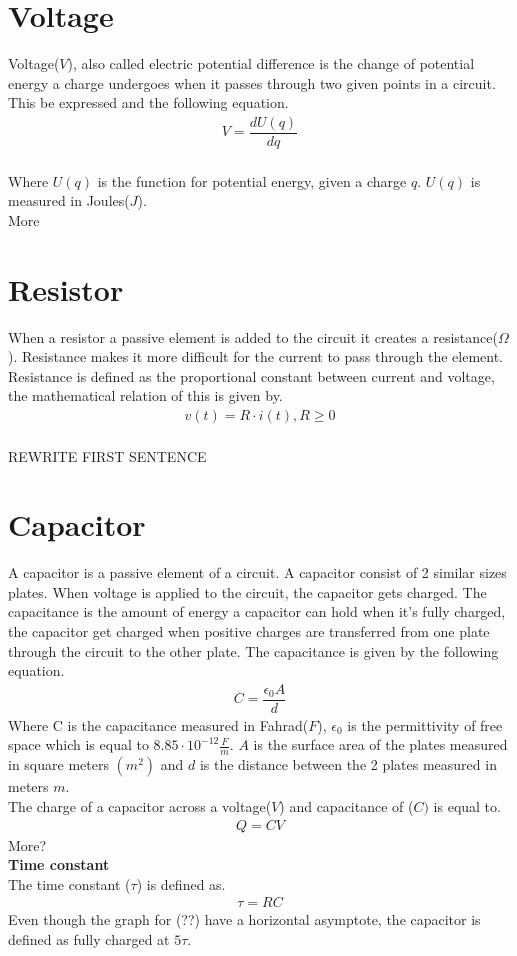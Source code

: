 \section{Voltage}
Voltage($V$), also called electric potential difference is the change of potential energy a charge undergoes when it passes through two given points in a circuit. This be expressed and the following equation.
\begin{align}
V=\dfrac{dU(q)}{dq}
\end{align}
\\
Where $U(q)$ is the function for potential energy, given a charge $q$. $U(q)$ is measured in Joules($J$).
\\
More
\\
\section{Resistor}
When a resistor a passive element is added to the circuit it creates a resistance($\Omega$). Resistance makes it more difficult for the current to pass through the element. Resistance is defined as the proportional constant between current and voltage, the mathematical relation of this is given by.
\begin{align}
v(t)=R\cdot i(t),  R\geq0
\end{align}
\\
REWRITE FIRST SENTENCE
\section{Capacitor}
A capacitor is a passive element of a circuit. A capacitor consist of 2 similar sizes plates. When voltage is applied to the circuit, the capacitor gets charged. The capacitance is the amount of energy a capacitor can hold when it's fully charged, the capacitor get charged when positive charges are transferred from one plate through the circuit to the other plate. The capacitance is given by the following equation.\
\begin{align}
C=\dfrac{\epsilon_{0}A}{d}
\end{align}
Where C is the capacitance measured in Fahrad($F$), $\epsilon_{0}$ is the permittivity of free space which is equal to $8.85 \cdot 10^{-12}                                                 \frac{F}{m}$. $A$ is the surface area of the plates measured in square meters $(m^{2})$ and $d$ is the distance between the 2 plates measured in meters $m$.
\\
The charge of a capacitor across a voltage($V$) and capacitance of ($C)$ is equal to.
\begin{align}
Q=CV	
\end{align}
More?
\\
\textbf{Time constant}
\\
The time constant ($\tau$) is defined as.
\begin{align}
\tau = RC
\end{align}
Even though the graph for (??) have a horizontal asymptote, the capacitor is defined as fully charged at $5\tau$.

